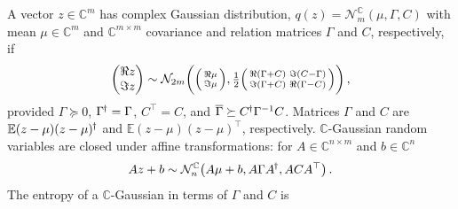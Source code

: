 \documentclass[a4paper,10pt]{article}
\newcommand{\cplx}{\mathbb{C}}
\newcommand{\hop}{{\mkern-1.5mu\dagger}}
\newcommand{\conj}[1]{\overline{#1}}
\begin{document}
A vector $z\in \cplx^m$ has complex Gaussian distribution, $
  q(z) = \mathcal{N}^{\cplx}_m(\mu, \Gamma, C)
$ with mean $\mu \in \cplx^m$ and $\cplx^{m\times m}$ covariance and relation matrices
$\Gamma$ and $C$, respectively, if
\begin{equation}  \label{eq:cn-paired-real-density}
  \begin{pmatrix}
    \Re z \\ \Im z
  \end{pmatrix}
    \sim \mathcal{N}_{2 m}\biggl(
      \Bigl(
        \begin{smallmatrix}
          \Re \mu \\ \Im \mu
        \end{smallmatrix}
      \Bigr),
      \tfrac12 \Bigl(
        \begin{smallmatrix}
          \Re{(\Gamma + C)} & \Im{(C - \Gamma)} \\
          \Im{(\Gamma + C)} & \Re{(\Gamma - C)}
        \end{smallmatrix}
      \Bigr)
    \biggr)
    \,,
\end{equation}
provided $\Gamma \succeq 0$, $\Gamma^{\hop} = \Gamma$, $C^\top = C$, and $
  \conj{\Gamma} \succeq C^{\hop} \Gamma^{-1} C
$. Matrices $\Gamma$ and $C$ are $
  \mathbb{E} (z - \mu)(z - \mu)^{\hop}
$ and $
  \mathbb{E} (z - \mu)(z - \mu)^{\top}
$, respectively.
%
%
$\cplx$-Gaussian random variables are closed under affine transformations: for $
  A \in \cplx^{n \times m}
$ and $b \in \cplx^{n}$
\begin{equation}  \label{eq:cn-affine}
  A z + b \sim \mathcal{N}_n^{\cplx}\bigl(
      A\mu + b, A \Gamma A^{\hop}, A C A^\top
    \bigr)
  \,.
\end{equation}
%
The entropy of a $\cplx$-Gaussian in terms of $\Gamma$ and $C$ is
\end{document}
